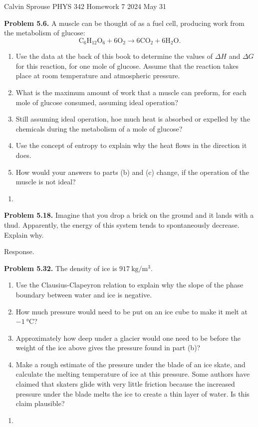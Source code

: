 \documentclass[a4paper, 12pt]{config/homework}
\begin{document}
\noindent
Calvin Sprouse \hfill PHYS 342 Homework 7 \hfill 2024 May 31
\bigskip

\bigskip\noindent
\textbf{Problem 5.6.} A muscle can be thought of as a fuel cell, producing work from the metabolism of glucose:
\[\text{C}_6\text{H}_{12}\text{O}_6 + 6\text{O}_2 \longrightarrow 6\text{CO}_2 + 6\text{H}_2\text{O}.\]
\begin{enumerate}[label=\textbf{(\alph*)}]
\item Use the data at the back of this book to determine the values of \(\Delta H\) and \(\Delta G\) for this reaction, for one mole of glucose. Assume that the reaction takes place at room temperature and atmospheric pressure.
\item What is the maximum amount of work that a muscle can preform, for each mole of glucose consumed, assuming ideal operation?
\item Still assuming ideal operation, hoe much heat is absorbed or expelled by the chemicals during the metabolism of a mole of glucose?
\item Use the concept of entropy to explain why the heat flows in the direction it does.
\item How would your answers to parts (b) and (c) change, if the operation of the muscle is not ideal?
\end{enumerate}
\begin{enumerate}[label=\textbf{(\alph*)}]
\item 
\end{enumerate}

\pagebreak\noindent
\textbf{Problem 5.18.} Imagine that you drop a brick on the ground and it lands with a thud. Apparently, the energy of this system tends to spontaneously decrease. Explain why.

\bigskip\noindent
Response.

\pagebreak\noindent
\textbf{Problem 5.32.} The density of ice is \(\qty{917}{\kg\per\meter\cubed}\).
\begin{enumerate}[label=\textbf{(\alph*)}]
\item Use the Clausius-Clapeyron relation to explain why the slope of the phase boundary between water and ice is negative.
\item How much pressure would need to be put on an ice cube to make it melt at \(\qty{-1}{\celsius}\)?
\item Approximately how deep under a glacier would one need to be before the weight of the ice above gives the pressure found in part (b)?
\item Make a rough estimate of the pressure under the blade of an ice skate, and calculate the melting temperature of ice at this pressure. Some authors have claimed that skaters glide with very little friction because the increased pressure under the blade melts the ice to create a thin layer of water. Is this claim plausible?
\end{enumerate}
\begin{enumerate}[label=\textbf{(\alph*)}]
\item 
\end{enumerate}
\end{document}
